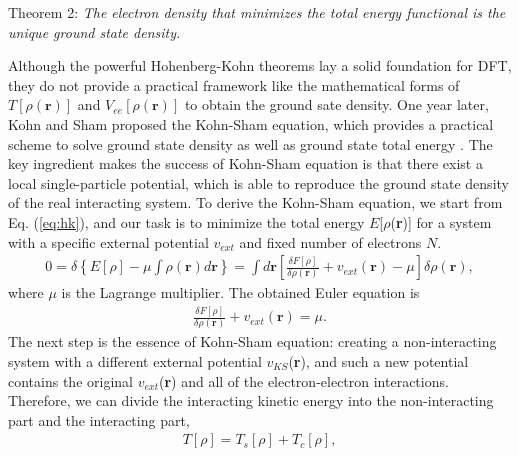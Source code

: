 	 {Theorem 2:
	  \textit{The electron density that minimizes the total energy functional is the   \\ 
	  \vspace{0pt}  \hspace{74pt} unique ground state density.  }
	  \singlespacing
	 }
	 
Although the powerful Hohenberg-Kohn theorems lay a solid foundation for DFT, they do not provide a practical framework like the mathematical forms of $T[\rho(\textbf{r})]$ and $V_{ee}[\rho(\textbf{r})]$ to obtain the ground sate density. One year later, Kohn and Sham proposed the Kohn-Sham equation, which provides a practical scheme to solve ground state density as well as ground state total energy \cite{DFT_2}. The key ingredient makes the success of Kohn-Sham equation is that there exist a local single-particle potential, which is able to reproduce the ground state density of the real interacting system. To derive the Kohn-Sham equation, we start from Eq. (\ref{eq:hk}), and our task is to minimize the total energy $E$[$\rho$(\textbf{r})] for a system with a specific external potential $v_{ext}$ and fixed number of electrons $N$. 
	\begin{equation}
	\label{variation}
	\begin{aligned}
        0 = \delta \left\{E[\rho] - \mu\int \rho(\textbf{r}) d\textbf{r} \right\} = \int d\textbf{r} \left[ \frac{\delta F[\rho]}{\delta \rho(\textbf{r})} + v_{ext}(\textbf{r}) - \mu \right] \delta \rho(\textbf{r}),
    \end{aligned}
	\end{equation}
where $\mu$ is the Lagrange multiplier. The obtained Euler equation is
	\begin{equation}
	\label{euler1}
	\begin{aligned}
        \frac{\delta F[\rho]}{\delta \rho(\textbf{r})} + v_{ext}(\textbf{r}) = \mu.
    \end{aligned}
	\end{equation}
The next step is the essence of Kohn-Sham equation: creating a non-interacting system with a different external potential $v_{KS}$(\textbf{r}), and such a new potential contains the original $v_{ext}$(\textbf{r}) and all of the electron-electron interactions. Therefore, we can divide the interacting kinetic energy into the non-interacting part and the interacting part,
	\begin{equation}
	\begin{aligned}
        T[\rho] = T_s[\rho] + T_c[\rho],
    \end{aligned}
	\end{equation}
